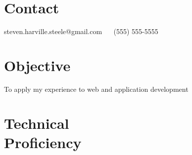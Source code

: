 \documentclass[margin,line]{resume}
\begin{document}
\begin{resume}

\vspace{1em}



\section{\mysidestyle Contact}

steven.harville.steele@gmail.com \ \textbf{\textbar} \ (555) 555-5555



\section{\mysidestyle Objective}


To apply my experience to web and application development







\section{\mysidestyle Technical\\Proficiency}


\end{resume}
\end{document}

